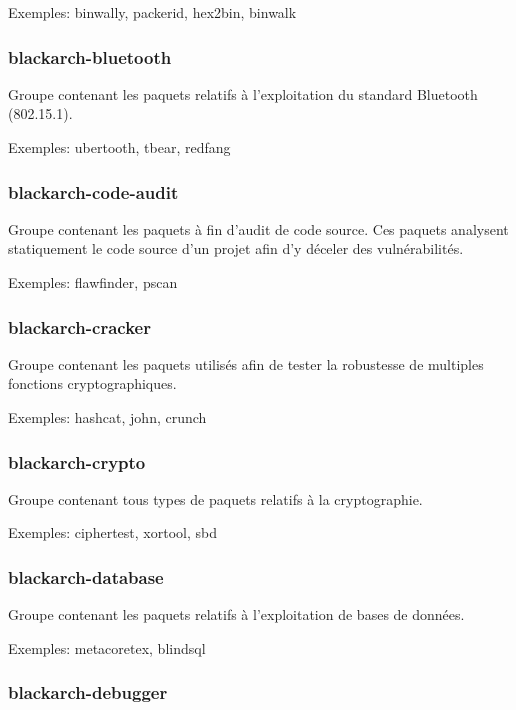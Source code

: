 \documentclass[a4paper, oneside, 11pt]{book}
\begin{document}
Exemples: binwally, packerid, hex2bin, binwalk

\subsubsection{blackarch-bluetooth}

Groupe contenant les paquets relatifs \`{a} l'exploitation du standard Bluetooth
(802.15.1).

Exemples: ubertooth, tbear, redfang

\subsubsection{blackarch-code-audit}

Groupe contenant les paquets \`{a} fin d'audit de code source. Ces paquets analysent statiquement le code source d'un projet afin d'y d\'{e}celer des vuln\'{e}rabilit\'{e}s.

Exemples: flawfinder, pscan

\subsubsection{blackarch-cracker}

Groupe contenant les paquets utilis\'{e}s afin de tester la robustesse de multiples fonctions cryptographiques.

Exemples: hashcat, john, crunch

\subsubsection{blackarch-crypto}

Groupe contenant tous types de paquets relatifs \`{a} la cryptographie.

Exemples: ciphertest, xortool, sbd

\subsubsection{blackarch-database}

Groupe contenant les paquets relatifs \`{a} l'exploitation de bases de donn\'{e}es.

Exemples: metacoretex, blindsql

\subsubsection{blackarch-debugger}
\end{document}
